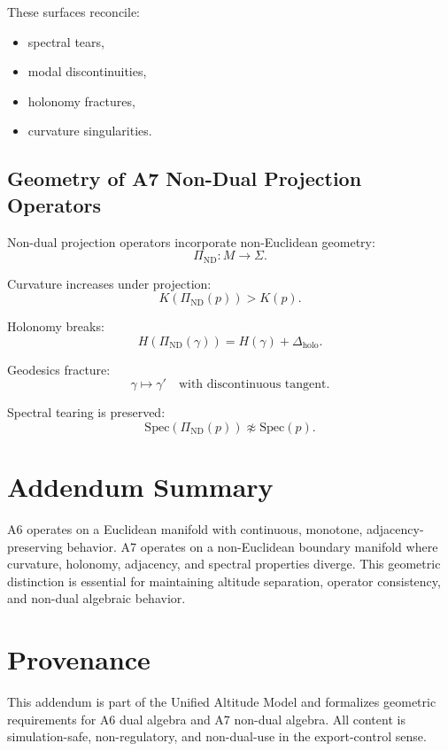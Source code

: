 These surfaces reconcile:
\begin{itemize}
  \item spectral tears,
  \item modal discontinuities,
  \item holonomy fractures,
  \item curvature singularities.
\end{itemize}

\subsection{Geometry of A7 Non-Dual Projection Operators}

Non-dual projection operators incorporate non-Euclidean geometry:
\[
\Pi_{\mathrm{ND}} : M \to \Sigma.
\]

Curvature increases under projection:
\[
K(\Pi_{\mathrm{ND}}(p)) > K(p).
\]

Holonomy breaks:
\[
H(\Pi_{\mathrm{ND}}(\gamma)) = H(\gamma) + \Delta_{\mathrm{holo}}.
\]

Geodesics fracture:
\[
\gamma \mapsto \gamma' \quad \text{with discontinuous tangent}.
\]

Spectral tearing is preserved:
\[
\mathrm{Spec}(\Pi_{\mathrm{ND}}(p)) \not\approx \mathrm{Spec}(p).
\]

\section{Addendum Summary}

A6 operates on a Euclidean manifold with continuous, monotone, adjacency-
preserving behavior. A7 operates on a non-Euclidean boundary manifold where
curvature, holonomy, adjacency, and spectral properties diverge. This geometric
distinction is essential for maintaining altitude separation, operator
consistency, and non-dual algebraic behavior.

\section*{Provenance}

This addendum is part of the Unified Altitude Model and formalizes geometric
requirements for A6 dual algebra and A7 non-dual algebra. All content is
simulation-safe, non-regulatory, and non-dual-use in the export-control sense.
